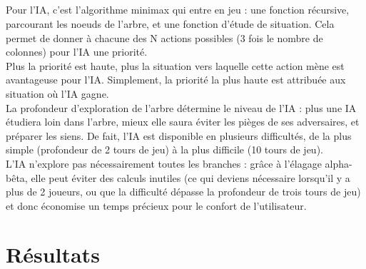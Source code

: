 \documentclass{report}
\begin{document}
    \paragraph*{} %
    Pour l'IA, c'est l'algorithme minimax qui entre en jeu : une fonction récursive, parcourant les noeuds de l'arbre, et une fonction d'étude de situation. 
    Cela permet de donner à chacune des N actions possibles (3 fois le nombre de colonnes) pour l'IA une priorité. \\
    Plus la priorité est haute, plus la situation vers laquelle cette action mène est avantageuse pour l'IA. Simplement, la priorité la plus haute est attribuée aux situation où 
    l'IA gagne. \\
    La profondeur d'exploration de l'arbre détermine le niveau de l'IA : plus une IA étudiera loin dans l'arbre, mieux elle saura éviter les pièges de ses adversaires, et préparer
    les siens. De fait, l'IA est disponible en plusieurs difficultés, de la plus simple (profondeur de 2 tours de jeu) à la plus difficile (10 tours de jeu). \\
    L'IA n'explore pas nécessairement toutes les branches : grâce à l'élagage alpha-bêta, elle peut éviter des calculs inutiles (ce qui deviens nécessaire lorsqu'il y a plus 
    de 2 joueurs, ou que la difficulté dépasse la profondeur de trois tours de jeu) et donc économise un temps précieux pour le confort de l'utilisateur.


\chapter{Résultats}
    \paragraph*{} %
    \paragraph*{} %
    \paragraph*{} %
    \paragraph*{} %
\end{document}
